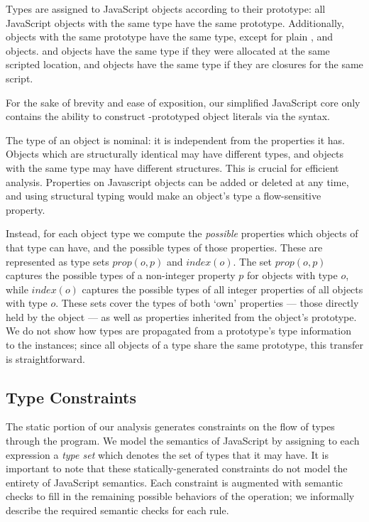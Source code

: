 Types are assigned to JavaScript objects according to their prototype:
all JavaScript objects with the same type have the same prototype.
Additionally, objects with the same prototype have the same type,
except for plain ,  and  objects.
 and  objects have the same type if they were
allocated at the same scripted location,
and  objects have the same type if they are closures
for the same script.

For the sake of brevity and ease of exposition, our simplified JavaScript core
only contains the ability to construct -prototyped object
literals via the \code{\{\}} syntax.

The type of an object is nominal: it is independent from the properties it
has. Objects which are structurally identical may have different types, and
objects with the same type may have different structures. This is crucial for
efficient analysis. Properties on Javascript objects can be added or deleted
at any time, and using structural typing would make an object's type a
flow-sensitive property.

Instead, for each object type we compute the {\it possible} properties which
objects of that type can have, and the possible types of those properties.
These are represented as type sets $\mathit{prop}(o,p)$ and
$\mathit{index}(o)$. The set $\mathit{prop}(o,p)$ captures the possible types
of a non-integer property $p$ for objects with type $o$, while
$\mathit{index}(o)$ captures the possible types of all integer properties of
all objects with type $o$.
These sets cover the types of both `own' properties --- those directly held
by the object --- as well as properties inherited from the object's prototype.
We do not show how types are propagated from a prototype's type information
to the instances; since all objects of a type share the same prototype,
this transfer is straightforward.

\subsection{Type Constraints}
\label{sec:constraints}

The static portion of our analysis generates constraints on the flow of types
through the program. We model the semantics of JavaScript by assigning to each
expression a \emph{type set} which denotes the set of types that it may
have. It is important to note that these statically-generated constraints do
not model the entirety of JavaScript semantics. Each constraint is augmented
with semantic checks to fill in the remaining possible behaviors of the
operation; we informally describe the required semantic checks for each rule.

